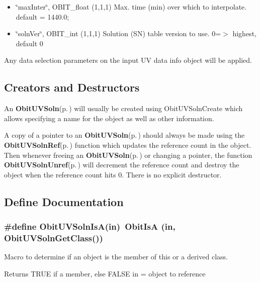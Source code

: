 \begin{itemize}
\item \char`\"{}max\-Inter\char`\"{}, OBIT\_\-float (1,1,1) Max. time (min) over which to interpolate. default = 1440.0;\end{itemize}
\begin{itemize}
\item \char`\"{}soln\-Ver\char`\"{}, OBIT\_\-int (1,1,1) Solution (SN) table version to use. 0=$>$ highest, default 0\end{itemize}
Any data selection parameters on the input UV data info object will be applied.\subsection{Creators and Destructors}\label{ObitUVSoln_8h_ObitUVSolnaccess}
An {\bf Obit\-UVSoln}{\rm (p.\,\pageref{structObitUVSoln})} will usually be created using Obit\-UVSoln\-Create which allows specifying a name for the object as well as other information.

A copy of a pointer to an {\bf Obit\-UVSoln}{\rm (p.\,\pageref{structObitUVSoln})} should always be made using the {\bf Obit\-UVSoln\-Ref}{\rm (p.\,\pageref{ObitUVSoln_8h_a1})} function which updates the reference count in the object. Then whenever freeing an {\bf Obit\-UVSoln}{\rm (p.\,\pageref{structObitUVSoln})} or changing a pointer, the function {\bf Obit\-UVSoln\-Unref}{\rm (p.\,\pageref{ObitUVSoln_8h_a0})} will decrement the reference count and destroy the object when the reference count hits 0. There is no explicit destructor.

\subsection{Define Documentation}
\subsubsection{\setlength{\rightskip}{0pt plus 5cm}\#define Obit\-UVSoln\-Is\-A(in)\ Obit\-Is\-A (in, Obit\-UVSoln\-Get\-Class())}\label{ObitUVSoln_8h_a2}


Macro to determine if an object is the member of this or a derived class. 

Returns TRUE if a member, else FALSE in = object to reference 
